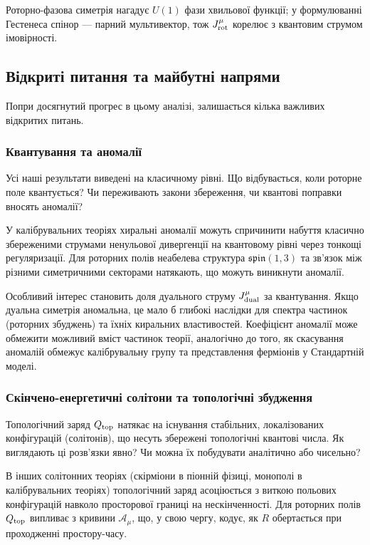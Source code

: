 \documentclass[11pt,a4paper]{article}
\numberwithin{equation}{section}
\theoremstyle{plain}
\theoremstyle{definition}
\theoremstyle{remark}
\begin{document}
Роторно-фазова симетрія нагадує $U(1)$ фази хвильової функції; у формулюванні Гестенеса спінор — парний мультивектор, тож $J^\mu_{\rm rot}$ корелює з квантовим струмом імовірності.

\subsection{Відкриті питання та майбутні напрями}

Попри досягнутий прогрес в цьому аналізі, залишається кілька важливих відкритих питань.

\subsubsection{Квантування та аномалії}

Усі наші результати виведені на класичному рівні. Що відбувається, коли роторне поле квантується? Чи переживають закони збереження, чи квантові поправки вносять аномалії?

У калібрувальних теоріях хиральні аномалії можуть спричинити набуття класично збереженими струмами ненульової дивергенції на квантовому рівні через тонкощі регуляризації. Для роторних полів неабелева структура $\mathfrak{spin}(1,3)$ та зв'язок між різними симетричними секторами натякають, що можуть виникнути аномалії.

Особливий інтерес становить доля дуального струму $J^\mu_{\rm dual}$ за квантування. Якщо дуальна симетрія аномальна, це мало б глибокі наслідки для спектра частинок (роторних збуджень) та їхніх киральних властивостей. Коефіцієнт аномалії може обмежити можливий вміст частинок теорії, аналогічно до того, як скасування аномалій обмежує калібрувальну групу та представлення ферміонів у Стандартній моделі.

\subsubsection{Скінчено-енергетичні солітони та топологічні збудження}

Топологічний заряд $Q_{\rm top}$ натякає на існування стабільних, локалізованих конфігурацій (солітонів), що несуть збережені топологічні квантові числа. Як виглядають ці розв'язки явно? Чи можна їх побудувати аналітично або чисельно?

В інших солітонних теоріях (скірміони в піонній фізиці, монополі в калібрувальних теоріях) топологічний заряд асоціюється з виткою польових конфігурацій навколо просторової границі на нескінченності. Для роторних полів $Q_{\rm top}$ випливає з кривини $\mathcal{A}_\mu$, що, у свою чергу, кодує, як $R$ обертається при проходженні простору-часу.
\end{document}
